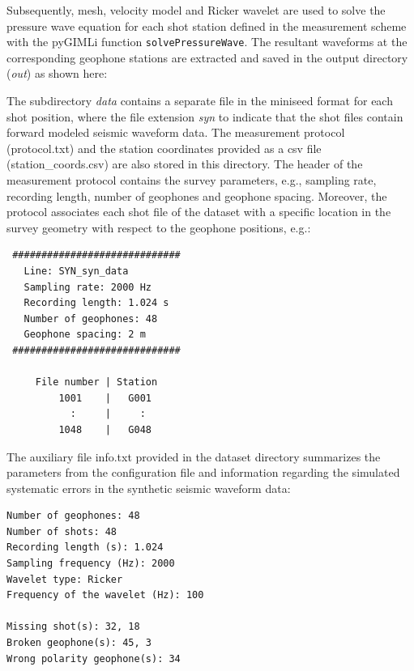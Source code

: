 \documentclass[a4paper,fleqn]{cas-sc}
\begin{document}
Subsequently, mesh, velocity model and Ricker wavelet are used to solve the pressure wave equation for each shot station defined in the measurement scheme with the pyGIMLi function \texttt{solvePressureWave}.
The resultant waveforms at the corresponding geophone stations are extracted and saved in the output directory (\textit{out}) as shown here:

The subdirectory \textit{data} contains a separate file in the miniseed format \citep{ahern2012, ringler2015} for each shot position, where the file extension \textit{syn} to indicate that the shot files contain forward modeled seismic waveform data. 
The measurement protocol (protocol.txt) and the station coordinates provided as a csv file (station\_coords.csv) are also stored in this directory. The header of the measurement protocol contains the survey parameters, e.g., sampling rate, recording length, number of geophones and geophone spacing. Moreover, the protocol associates each shot file of the dataset with a specific location in the survey geometry with respect to the geophone positions, e.g.:
\begin{footnotesize}
\begin{verbatim}
 #############################
   Line: SYN_syn_data             
   Sampling rate: 2000 Hz    
   Recording length: 1.024 s 
   Number of geophones: 48   
   Geophone spacing: 2 m     
 #############################
 
     File number | Station
         1001    |   G001
           :     |     :
         1048    |   G048
\end{verbatim}
\end{footnotesize}
The auxiliary file info.txt provided in the dataset directory summarizes the parameters from the configuration file and information regarding the simulated systematic errors in the synthetic seismic waveform data:
\begin{footnotesize}
\begin{verbatim}
Number of geophones: 48
Number of shots: 48
Recording length (s): 1.024
Sampling frequency (Hz): 2000
Wavelet type: Ricker
Frequency of the wavelet (Hz): 100

Missing shot(s): 32, 18
Broken geophone(s): 45, 3
Wrong polarity geophone(s): 34
\end{verbatim}
\end{footnotesize}
\end{document}
